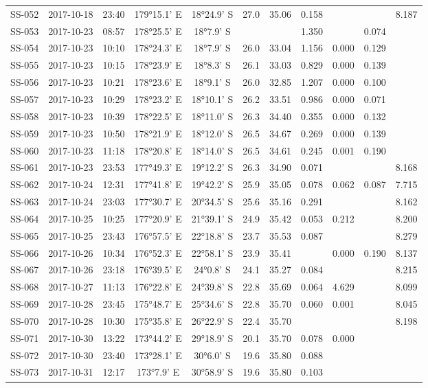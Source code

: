 \begin{longtable}{ccccccccccc}
  SS-052 & 2017-10-18 & 23:40 & 179°15.1' E & 18°24.9' S & 27.0 & 35.06 & 0.158 &  &  & 8.187 \\ 
  SS-053 & 2017-10-23 & 08:57 & 178°25.5' E & 18°7.9' S &  &  & 1.350 &  & 0.074 &  \\ 
  SS-054 & 2017-10-23 & 10:10 & 178°24.3' E & 18°7.9' S & 26.0 & 33.04 & 1.156 & 0.000 & 0.129 &  \\ 
  SS-055 & 2017-10-23 & 10:15 & 178°23.9' E & 18°8.3' S & 26.1 & 33.03 & 0.829 & 0.000 & 0.139 &  \\ 
  SS-056 & 2017-10-23 & 10:21 & 178°23.6' E & 18°9.1' S & 26.0 & 32.85 & 1.207 & 0.000 & 0.100 &  \\ 
  SS-057 & 2017-10-23 & 10:29 & 178°23.2' E & 18°10.1' S & 26.2 & 33.51 & 0.986 & 0.000 & 0.071 &  \\ 
  SS-058 & 2017-10-23 & 10:39 & 178°22.5' E & 18°11.0' S & 26.3 & 34.40 & 0.355 & 0.000 & 0.132 &  \\ 
  SS-059 & 2017-10-23 & 10:50 & 178°21.9' E & 18°12.0' S & 26.5 & 34.67 & 0.269 & 0.000 & 0.139 &  \\ 
  SS-060 & 2017-10-23 & 11:18 & 178°20.8' E & 18°14.0' S & 26.5 & 34.61 & 0.245 & 0.001 & 0.190 &  \\ 
  SS-061 & 2017-10-23 & 23:53 & 177°49.3' E & 19°12.2' S & 26.3 & 34.90 & 0.071 &  &  & 8.168 \\ 
  SS-062 & 2017-10-24 & 12:31 & 177°41.8' E & 19°42.2' S & 25.9 & 35.05 & 0.078 & 0.062 & 0.087 & 7.715 \\ 
  SS-063 & 2017-10-24 & 23:03 & 177°30.7' E & 20°34.5' S & 25.6 & 35.16 & 0.291 &  &  & 8.162 \\ 
  SS-064 & 2017-10-25 & 10:25 & 177°20.9' E & 21°39.1' S & 24.9 & 35.42 & 0.053 & 0.212 &  & 8.200 \\ 
  SS-065 & 2017-10-25 & 23:43 & 176°57.5' E & 22°18.8' S & 23.7 & 35.53 & 0.087 &  &  & 8.279 \\ 
  SS-066 & 2017-10-26 & 10:34 & 176°52.3' E & 22°58.1' S & 23.9 & 35.41 &  & 0.000 & 0.190 & 8.137 \\ 
  SS-067 & 2017-10-26 & 23:18 & 176°39.5' E & 24°0.8' S & 24.1 & 35.27 & 0.084 &  &  & 8.215 \\ 
  SS-068 & 2017-10-27 & 11:13 & 176°22.8' E & 24°39.8' S & 22.8 & 35.69 & 0.064 & 4.629 &  & 8.099 \\ 
  SS-069 & 2017-10-28 & 23:45 & 175°48.7' E & 25°34.6' S & 22.8 & 35.70 & 0.060 & 0.001 &  & 8.045 \\ 
  SS-070 & 2017-10-28 & 10:30 & 175°35.8' E & 26°22.9' S & 22.4 & 35.70 &  &  &  & 8.198 \\ 
  SS-071 & 2017-10-30 & 13:22 & 173°44.2' E & 29°18.9' S & 20.1 & 35.70 & 0.078 & 0.000 &  &  \\ 
  SS-072 & 2017-10-30 & 23:40 & 173°28.1' E & 30°6.0' S & 19.6 & 35.80 & 0.088 &  &  &  \\ 
  SS-073 & 2017-10-31 & 12:17 & 173°7.9' E & 30°58.9' S & 19.6 & 35.80 & 0.103 &  &  &  \\ 
  \hline
\end{longtable}

